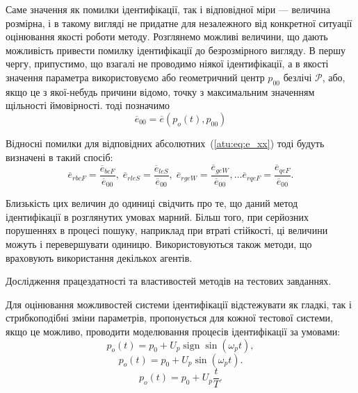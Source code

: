 \documentclass[a4paper,13pt]{atuaref}
\DeclareMathOperator*{\sign}{sign}
\begin{document}
Саме значення як помилки ідентифікації, так і відповідної міри ---
величина розмірна, і в такому вигляді не придатне для незалежного від
конкретної ситуації оцінювання якості роботи методу. Розглянемо можливі
величини, що дають можливість привести помилку ідентифікації до безрозмірного
вигляду. В першу чергу, припустимо, що взагалі не проводимо ніякої
ідентифікації, а в якості значення параметра використовуємо або геометричний
центр $ p_{00} $ безлічі $ \mathcal{P} $, або, якщо це з якої-небудь причини
відомо, точку з максимальним значенням щільності ймовірності. тоді позначимо
%
\begin{equation}
  \overline{e}_{00}
  =
  \overline{e}(p_o(t),p_{00})
  \label{atu:eq:e_00}
\end{equation}

Відносні помилки для відповідних абсолютних~(\ref{atu:eq:e_xx})
тоді будуть визначені в такий спосіб:
%
\begin{equation}
  \overline{e}_{rbcF} = \frac{\overline{e}_{bcF}}{\overline{e}_{00}}, \;
  \overline{e}_{rleS} = \frac{\overline{e}_{leS}}{\overline{e}_{00}}, \;
  \overline{e}_{rgeW} = \frac{\overline{e}_{geW}}{\overline{e}_{00}},
  \ldots
  \overline{e}_{rqeF} = \frac{\overline{e}_{qeF}}{\overline{e}_{00}}.
  \label{atu:eq:e_rxx}
\end{equation}

Близькість цих величин до одиниці свідчить про те, що даний метод ідентифікації
в розглянутих умовах марний. Більш того, при серйозних порушеннях в процесі
пошуку, наприклад при втраті стійкості, ці величини можуть і перевершувати
одиницю. Використовуються також методи, що враховують
використання декількох агентів.

Дослідження працездатності та властивостей методів на тестових завданнях.

Для оцінювання можливостей системи ідентифікації відстежувати як гладкі, так і
стрибкоподібні зміни параметрів, пропонується для кожної тестової системи, якщо
це можливо, проводити моделювання процесів ідентифікації за умовами:
%
\begin{equation}
  p_o(t) = p_0 +  U_{p} \sign \sin( \omega_{p} t ),
  \label{atu:eq:po_t_sign}
\end{equation}
%
%
\begin{equation}
  p_o(t) = p_0 +  U_{p} \sin( \omega_{p} t ).
  \label{atu:eq:po_t_sin}
\end{equation}
%
\begin{equation}
  p_o(t) = p_0 +  U_{p} \frac{t}{T}.
  \label{atu:eq:po_t_ramp}
\end{equation}
\end{document}
